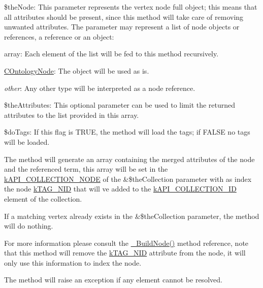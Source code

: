 \begin{DoxyItemize}
\begin{DoxyItemize}
\end{DoxyItemize}
\item {\ttfamily \$the\-Node}\-: This parameter represents the vertex node full object; this means that all attributes should be present, since this method will take care of removing unwanted attributes. The parameter may represent a list of node objects or references, a reference or an object\-: 
\begin{DoxyItemize}
\item {\ttfamily array}\-: Each element of the list will be fed to this method recursively. 
\item {\ttfamily \hyperlink{class_c_ontology_node}{C\-Ontology\-Node}}\-: The object will be used as is. 
\item {\itshape other}\-: Any other type will be interpreted as a node reference. 
\end{DoxyItemize}
\item {\ttfamily \$the\-Attributes}\-: This optional parameter can be used to limit the returned attributes to the list provided in this array. 
\item {\ttfamily \$do\-Tags}\-: If this flag is {\ttfamily T\-R\-U\-E}, the method will load the tags; if {\ttfamily F\-A\-L\-S\-E} no tags will be loaded. 
\end{DoxyItemize}

The method will generate an array containing the merged attributes of the node and the referenced term, this array will be set in the \hyperlink{}{k\-A\-P\-I\-\_\-\-C\-O\-L\-L\-E\-C\-T\-I\-O\-N\-\_\-\-N\-O\-D\-E} of the {\ttfamily \&\$the\-Collection} parameter with as index the node \hyperlink{}{k\-T\-A\-G\-\_\-\-N\-I\-D} that will ve added to the \hyperlink{}{k\-A\-P\-I\-\_\-\-C\-O\-L\-L\-E\-C\-T\-I\-O\-N\-\_\-\-I\-D} element of the collection.

If a matching vertex already exists in the {\ttfamily \&\$the\-Collection} parameter, the method will do nothing.

For more information please consult the \hyperlink{class_c_ontology_wrapper_a3149d34bb488513db2d572f3002bebce}{\-\_\-\-Build\-Node()} method reference, note that this method will remove the \hyperlink{}{k\-T\-A\-G\-\_\-\-N\-I\-D} attribute from the node, it will only use this information to index the node.

The method will raise an exception if any element cannot be resolved.


